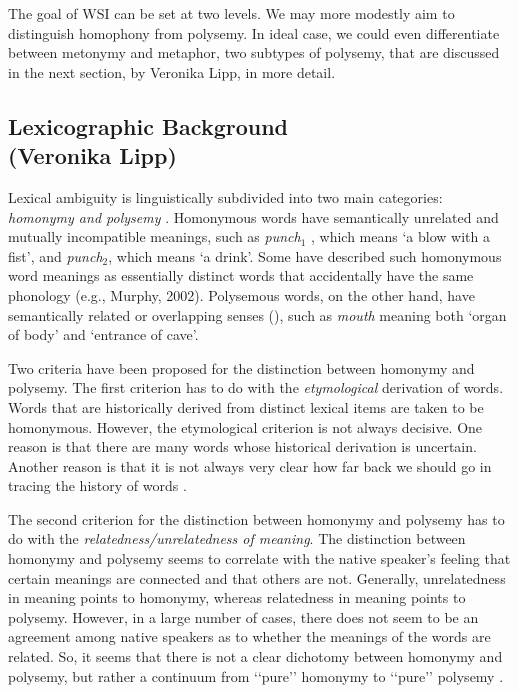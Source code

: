 \documentclass[11pt]{article}
\begin{document}

The goal of WSI can be set at two levels. We may more modestly aim to
distinguish homophony from polysemy. In ideal case, we could even differentiate
between metonymy and metaphor, two subtypes of polysemy, that are discussed in
the next section, by Veronika Lipp, in more detail.

\subsection{Lexicographic Background \\ (Veronika Lipp)}

\label{sec:bground}

Lexical ambiguity is linguistically subdivided into two main categories:
\emph{homonymy and polysemy} \citep{Cruse:2004}. Homonymous words have
semantically unrelated and mutually incompatible meanings, such as
\emph{punch$_1$} , which means `a blow with a fist', and \emph{punch$_2$},
which means `a drink'. Some have described such homonymous word meanings as
essentially distinct words that accidentally have the same phonology (e.g.,
Murphy, 2002). Polysemous words, on the other hand, have semantically related
or overlapping senses (\cite{Cruse:2004,Jackendoff:2002, Pustejovsky:1995}),
such as \emph{mouth} meaning both `organ of body' and `entrance of cave'.

Two criteria have been proposed for the distinction between homonymy and
polysemy. The first criterion has to do with the \emph{etymological} derivation
of words. Words that are historically derived from distinct lexical items are
taken to be homonymous. However, the etymological criterion is not always
decisive. One reason is that there are many words whose historical derivation
is uncertain. Another reason is that it is not always very clear how far back
we should go in tracing the history of words \citep{Lyons:1977}.

The second criterion for the distinction between homonymy and polysemy has to
do with the \emph{relatedness/unrelatedness of meaning}.  The distinction
between homonymy and polysemy seems to correlate with the native speaker’s
feeling that certain meanings are connected and that others are not. Generally,
unrelatedness in meaning points to homonymy, whereas relatedness in meaning
points to polysemy.  However, in a large number of cases, there does not seem
to be an agreement among native speakers as to whether the meanings of the
words are related. So, it seems that there is not a clear dichotomy between
homonymy and polysemy, but rather a continuum from ‘‘pure’’ homonymy to
‘‘pure’’ polysemy \citep{Lyons:1977}.
\end{document}
